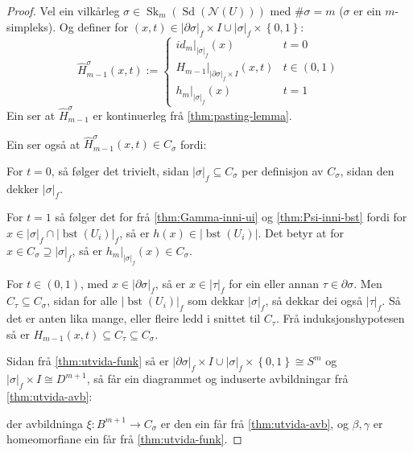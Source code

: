 \documentclass[a4paper, 12pt, norsk]{article}
\theoremstyle{plain}
\theoremstyle{definition}
\newcommand{\Nc}{\mathcal{N}}
\newcommand{\intersect}{ \mathop{\cap}\limits }
\newcommand{\union}{ \mathop{\cup}\limits }
\newcommand{\gr}[1]{ \lvert #1 \rvert } %
\newcommand{\set}[1]{ \left\{ #1 \right\} } %
\DeclareMathOperator{\Sd}{Sd} %
\DeclareMathOperator{\bst}{bst} %
\DeclareMathOperator{\Sk}{Sk} %
\begin{document}
\begin{proof}
	Vel ein vilkårleg \( \sigma \in \Sk_m(\Sd(\Nc(U))) \) med \( \#\sigma = m \) (\( \sigma \) er ein \( m \)-simpleks). Og definer for \( (x, t) \in \gr{\partial\sigma}_f \times I \union \gr{\sigma}_f \times \set{0, 1} \): 
	\[
		\hat{H}_{m-1}^\sigma (x,t) := 
		\begin{cases}
			id_m|_{\gr{\sigma}_f}(x) & t=0 \\
			H_{m-1}|_{\gr{\partial\sigma}_f \times I}(x,t) & t \in (0, 1) \\
			h_m|_{\gr{\sigma}_f}(x) & t=1
		\end{cases}
	\]
	Ein ser at \( \hat{H}_{m-1}^\sigma \) er kontinuerleg frå \autoref{thm:pasting-lemma}.
	
	Ein ser også at \( \hat{H}_{m-1}^\sigma (x,t) \in C_\sigma \) fordi: 
	
	For \( t = 0 \), så følger det trivielt, sidan \( \gr{\sigma}_f \subseteq C_\sigma \) per definisjon av \( C_\sigma \), sidan den dekker \( \gr{\sigma}_f \).
	
	For \( t = 1 \) så følger det for frå \autoref{thm:Gamma-inni-ui} og \autoref{thm:Psi-inni-bst} fordi for \( x \in \gr{\sigma}_f \intersect \gr{\bst(U_i)}_f \), så er \( h(x) \in \gr{\bst(U_i)} \). Det betyr at for \( x \in C_\sigma \supseteq \gr{\sigma}_f \), så er \( h_m|_{\gr{\sigma}_f}(x) \in C_\sigma \). 
	
	For \( t \in (0, 1) \), med \( x \in \gr{\partial\sigma}_f \), så er \( x \in \gr{\tau}_f \) for ein eller annan \( \tau \in \partial\sigma \). Men \( C_\tau \subseteq C_\sigma \), sidan for alle \( \gr{\bst(U_i)}_f \) som dekkar \( \gr{\sigma}_f \), så dekkar dei også \( \gr{\tau}_f \). Så det er anten lika mange, eller fleire ledd i snittet til \( C_\tau \). Frå induksjonshypotesen så er \( H_{m-1}(x, t) \subseteq C_{\tau} \subseteq C_\sigma \).

	Sidan frå \autoref{thm:utvida-funk} så er \( \gr{\partial\sigma}_f \times I \union \gr{\sigma}_f \times \set{0, 1} \cong S^{m} \) og \( \gr{\sigma}_f \times I \cong D^{m+1} \), så får ein diagrammet og induserte avbildningar frå \autoref{thm:utvida-avb}:

	\begin{center}
	\end{center}
	der avbildninga \( \xi: B^{m+1} \to C_\sigma \) er den ein får frå \autoref{thm:utvida-avb}, og \( \beta, \gamma \) er homeomorfiane ein får frå \autoref{thm:utvida-funk}.


\end{proof}
\end{document}
